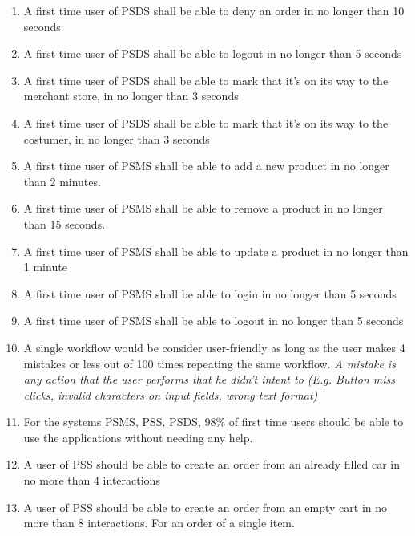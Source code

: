 \begin{enumerate}[resume, label=USE-\arabic*]
    \item A first time user of PSDS shall be able to deny an order in no 
    longer than 10 seconds
    \item A first time user of PSDS shall be able to logout in no longer 
    than 5 seconds
    \item A first time user of PSDS shall be able to mark that it’s on its 
    way to the merchant store, in no longer than 3 seconds
    \item A first time user of PSDS shall be able to mark that it’s on its 
    way to the costumer, in no longer than 3 seconds
    \item A first time user of PSMS shall be able to add a new product in 
    no longer than 2 minutes.
    \item A first time user of PSMS shall be able to remove a product in 
    no longer than 15 seconds.
    \item A first time user of PSMS shall be able to update a product in 
    no longer than 1 minute
    \item A first time user of PSMS shall be able to login in no longer 
    than 5 seconds
    \item A first time user of PSMS shall be able to logout in no longer 
    than 5 seconds
    \item A single workflow would be consider user-friendly as long as the 
    user makes 4 mistakes or less out of 100 times repeating the same workflow. 
    \textit{A mistake is any action that the user performs that he didn’t 
    intent to (E.g. Button miss clicks, invalid characters on input fields, 
    wrong text format)}
    \item For the systems PSMS, PSS, PSDS, 98\% of first time users should be 
    able to use the applications without needing any help.
    \item A user of PSS should be able to create an order from an already 
    filled car in no more than 4 interactions
    \item A user of PSS should be able to create an order from an empty cart 
    in no more than 8 interactions. For an order of a single item.
\end{enumerate}
\pagebreak
